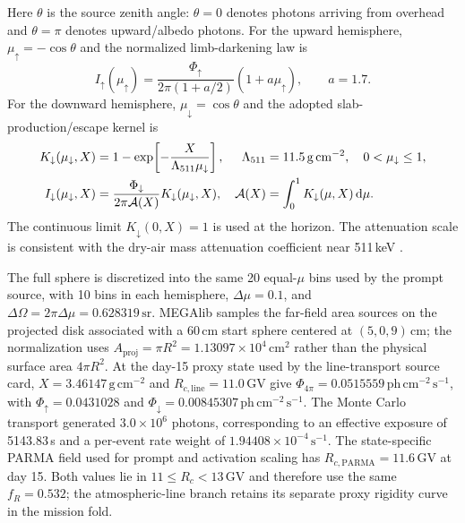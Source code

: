 \documentclass[11pt]{article}
\begin{document}
Here $\theta$ is the source zenith angle: $\theta=0$ denotes photons arriving
from overhead and $\theta=\pi$ denotes upward/albedo photons. For the upward
hemisphere, $\mu_{\uparrow}=-\cos\theta$ and the normalized
limb-darkening law is
\begin{equation}
  I_{\uparrow}(\mu_{\uparrow})=
  \frac{\Phi_{\uparrow}}{2\pi(1+a/2)}(1+a\mu_{\uparrow}),
  \qquad a=1.7 .
  \label{eq:atm511_upward}
\end{equation}
For the downward hemisphere, $\mu_{\downarrow}=\cos\theta$ and the adopted
slab-production/escape kernel is
\begin{align}
  K_{\downarrow}(\mu_{\downarrow},X)
    &=1-\exp\!\left[-\frac{X}{\Lambda_{511}\mu_{\downarrow}}\right],
    &\Lambda_{511}&=11.5\,\mathrm{g\,cm^{-2}},\quad 0<\mu_{\downarrow}\le1, \notag\\
  I_{\downarrow}(\mu_{\downarrow},X)
    &=\frac{\Phi_{\downarrow}}{2\pi\mathcal{A}(X)}
      K_{\downarrow}(\mu_{\downarrow},X),
    &\mathcal{A}(X)&=\int_0^1K_{\downarrow}(\mu,X)\,\mathrm{d}\mu .
  \label{eq:atm511_downward}
\end{align}
The continuous limit $K_{\downarrow}(0,X)=1$ is used at the horizon. The
attenuation scale is consistent with the dry-air mass attenuation coefficient
near 511\,keV \cite{NISTXCOM}.

The full sphere is discretized into the same 20 equal-$\mu$ bins used by the
prompt source, with 10 bins in each hemisphere, $\Delta\mu=0.1$, and
$\Delta\Omega=2\pi\Delta\mu=0.628319\,\mathrm{sr}$. MEGAlib
samples the far-field area sources on the projected disk
associated with a 60\,cm start sphere centered at $(5,0,9)$\,cm; the normalization
uses $A_{\mathrm{proj}}=\pi R^2=1.13097\times10^4\,\mathrm{cm^2}$ rather than
the physical surface area $4\pi R^2$. At the day-15 proxy state used by the
line-transport source card, $X=3.46147\,\mathrm{g\,cm^{-2}}$ and
$R_{c,\mathrm{line}}=11.0\,\mathrm{GV}$ give $\Phi_{4\pi}=0.0515559\,
\mathrm{ph\,cm^{-2}\,s^{-1}}$, with $\Phi_{\uparrow}=0.0431028$ and
$\Phi_{\downarrow}=0.00845307\,\mathrm{ph\,cm^{-2}\,s^{-1}}$. The Monte Carlo
transport generated $3.0\times10^6$ photons, corresponding to an effective
exposure of 5143.83\,s and a per-event rate weight of
$1.94408\times10^{-4}\,\mathrm{s^{-1}}$. The state-specific PARMA field used
for prompt and activation scaling has $R_{c,\mathrm{PARMA}}=11.6\,\mathrm{GV}$
at day 15. Both values lie in $11\le R_c<13\,\mathrm{GV}$ and therefore use the
same $f_R=0.532$; the atmospheric-line branch retains its separate proxy rigidity
curve in the mission fold.
\end{document}
